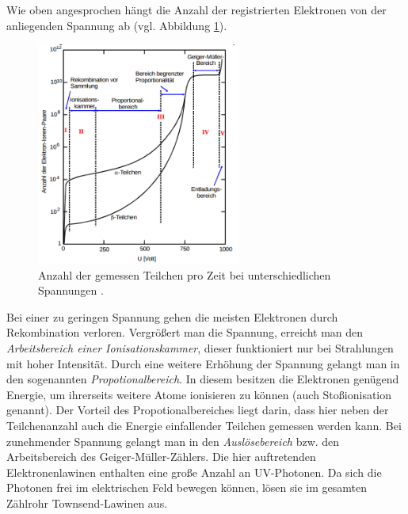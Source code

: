 Wie oben angesprochen hängt die Anzahl der registrierten
Elektronen von der anliegenden Spannung ab (vgl. Abbildung \ref{fig:teilchen_spannung}).
\begin{figure}
  \centering
  \includegraphics[width=0.6\textwidth]{bilder/diagramm.png}
  \caption{Anzahl der gemessen Teilchen pro Zeit bei unterschiedlichen Spannungen \cite{anleitung703}.} %
  \label{fig:teilchen_spannung}
\end{figure}
Bei einer zu geringen Spannung gehen die meisten Elektronen durch Rekombination verloren. Vergrößert man die Spannung,
erreicht man den \emph{Arbeitsbereich einer Ionisationskammer}, dieser funktioniert nur bei
Strahlungen mit hoher Intensität. Durch eine weitere Erhöhung der Spannung gelangt man
in den sogenannten \emph{Propotionalbereich}. In diesem besitzen die Elektronen
genügend Energie, um ihrerseits weitere Atome ionisieren zu können (auch Stoßionisation genannt).
Der Vorteil des Propotionalbereiches liegt darin, dass hier neben der Teilchenanzahl auch die Energie %
einfallender Teilchen gemessen werden kann. Bei zunehmender Spannung %
gelangt man in den \emph{Auslösebereich} bzw. den Arbeitsbereich des
Geiger-Müller-Zählers. Die hier auftretenden Elektronenlawinen enthalten %
eine große Anzahl an UV-Photonen. Da sich die Photonen frei im elektrischen Feld bewegen können,
lösen sie im gesamten Zählrohr Townsend-Lawinen aus. %

